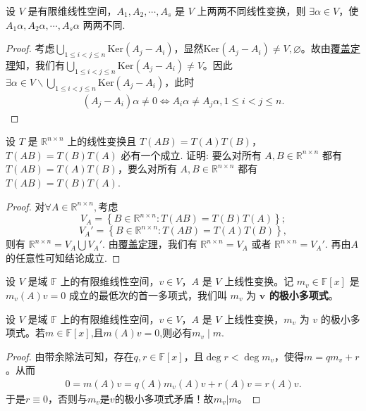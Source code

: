 \documentclass[../../main.tex]{subfiles}
\begin{document}
\begin{example}
设 \( V \) 是有限维线性空间，\( A_1, A_2, \cdots, A_s \) 是 \( V \) 上两两不同线性变换，则 \( \exists \alpha \in V \)，使 \( A_1\alpha, A_2\alpha, \cdots, A_s\alpha \) 两两不同.
\end{example}
\begin{proof}
考虑$\bigcup_{1\leqslant i<j\leqslant n}{\mathrm{Ker}\left( A_j-A_i \right)}$，显然$\mathrm{Ker}\left( A_j-A_i \right) \ne V,\varnothing$。故由\hyperref[theorem:覆盖定理]{覆盖定理}知，我们有$\bigcup_{1\leqslant i<j\leqslant n}{\mathrm{Ker}\left( A_j-A_i \right)}\ne V$。因此$\exists \alpha \in V\backslash \bigcup_{1\leqslant i<j\leqslant n}{\mathrm{Ker}\left( A_j-A_i \right)}$，此时
\begin{align*}
\left( A_j-A_i \right) \alpha \ne 0\Longleftrightarrow A_i\alpha \ne A_j\alpha ,1\leqslant i<j\leqslant n.
\end{align*}
\end{proof}

\begin{example}
设 \( T \) 是 \( \mathbb{R}^{n \times n} \) 上的线性变换且 \( T(AB) = T(A)T(B) \)，\( T(AB) = T(B)T(A) \) 必有一个成立. 证明: 要么对所有 \( A, B \in \mathbb{R}^{n \times n} \) 都有 \( T(AB) = T(A)T(B) \)，要么对所有 \( A, B \in \mathbb{R}^{n \times n} \) 都有 \( T(AB) = T(B)T(A) \).  
\end{example}
\begin{proof}
对$\forall A\in \mathbb{R}^{n\times n},$考虑  
\[
V_A = \left\{ B \in \mathbb{R}^{n \times n} : T(AB) = T(B)T(A) \right\};
\]  
\[
V_A' = \left\{ B \in \mathbb{R}^{n \times n} : T(AB) = T(A)T(B) \right\},
\]  
则有 \( \mathbb{R}^{n \times n} = V_A \bigcup V_A' \). 由\hyperref[theorem:覆盖定理]{覆盖定理}，我们有 \( \mathbb{R}^{n \times n} = V_A \) 或者 \( \mathbb{R}^{n \times n} = V_A' \).  
再由$A$的任意性可知结论成立.
\end{proof}

\begin{definition}
设 \( V \) 是域 \( \mathbb{F} \) 上的有限维线性空间，\( v \in V \)，\( A \) 是 \( V \) 上线性变换。记 \( m_v \in \mathbb{F}[x] \) 是 \( m_v(A)v = 0 \) 成立的最低次的首一多项式，我们叫 \( m_v \) 为\textbf{ \( \boldsymbol{v} \) 的极小多项式}。
\end{definition}

\begin{proposition}\label{proposition:向量的极小多项式的整性}
设 \( V \) 是域 \( \mathbb{F} \) 上的有限维线性空间，\( v \in V \)，\( A \) 是 \( V \) 上线性变换，\( m_v \) 为 \( v \) 的极小多项式。若$m\in \mathbb{F}[x]$,且$m(A)v=0$,则必有$m_v\mid m.$
\end{proposition}
\begin{proof}
由带余除法可知，存在\( q,r\in \mathbb{F}[x] \)，且\( \deg r<\deg m_v \)，使得\( m=qm_v+r \)。从而
\begin{align*}
0=m(A)v=q(A)m_v(A)v+r(A)v=r(A)v.
\end{align*}
于是\( r\equiv 0 \)，否则与\( m_v \)是\( v \)的极小多项式矛盾！故\( m_v|m \)。
\end{proof}
\end{document}

